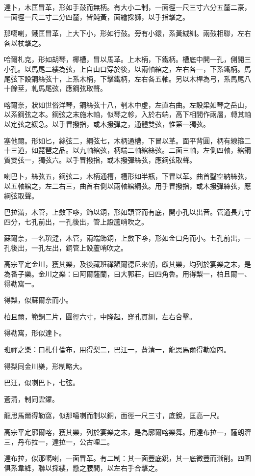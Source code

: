 \begin{pinyinscope}
達卜，木匡冒革，形如手鼓而無柄。有大小二制，一面徑一尺三寸六分五釐二豪，一面徑一尺二寸二分四釐，皆魨黃，面繪採獅，以手指擊之。

那噶喇，鐵匡冒革，上大下小，形如行鼓。旁有小鐶，系黃絨紃。兩鼓相聯，左右各以杖擊之。

哈爾札克，形如胡琴，椰槽，冒以馬革。上木柄，下鐵柄。槽底中開一孔，側開三小孔。以馬尾二縷為弦，上自山口穿於後，以兩軸綰之，左右各一，下系鐵柄。馬尾弦下設鋼絲弦十，上系木柄，下擊鐵柄，左右各五軸。另以木桿為弓，系馬尾八十餘莖，軋馬尾弦，應鋼弦取聲。

喀爾奈，狀如世俗洋琴，鋼絲弦十八，刳木中虛，左直右曲。左設梁如琴之岳山，以系鋼弦之本。鋼弦之末施木軸，似琴之軫，入於右端，高下相間作兩層，轉其軸以定弦之緩急。以手冒撥指，或木撥彈之，通體雙弦，惟第一獨弦。

塞他爾。形如匕，絲弦二，綱弦七，木柄通槽，下冒以革。面平背圓，柄有線箍二十三道，如琵琶之品。以九軸綰弦，柄端二軸綰絲弦。二面三軸，左側四軸，綰鋼質雙弦一，獨弦六。以手冒撥指，或木撥彈絲弦，應鋼弦取聲。

喇巴卜，絲弦五，鋼弦二，木柄通槽，槽形如半瓶，下冒以革。曲首鑿空納絲弦，以五軸綰之，左二右三，曲首右側以兩軸綰綱弦。用手冒撥指，或木撥彈絲弦，應綱弦取聲。

巴拉滿，木管，上斂下哆，飾以銅，形如頭管而有底，開小孔以出音。管通長九寸四分，七孔前出，一孔後出，管上設蘆哨吹之。

蘇爾奈，一名瑣澾，木管，兩端飾銅，上斂下哆，形如金口角而小。七孔前出，一孔後出，一孔左出，銅管上設蘆哨吹之。

高宗平定金川，獲其樂，及後藏班禪額爾德尼來朝，獻其樂，均列於宴樂之末，是為番子樂。金川之樂：曰阿爾薩蘭，曰大郭莊，曰四角魯。用得梨一，柏且爾一、得勒窩一。

得梨，似蘇爾奈而小。

柏且爾，範銅二片，圓徑六寸，中隆起，穿孔貫紃，左右合擊。

得勒窩，形似達卜。

班禪之樂：曰札什倫布，用得梨二，巴汪一，蒼清一，龍思馬爾得勒窩四。

得梨同金川樂，形制略大。

巴汪，似喇巴卜，七弦。

蒼清，制同雲鑼。

龍思馬爾得勒窩，似那噶喇而制以銅，面徑一尺三寸，底銳，匡高一尺。

高宗平定廓爾喀，獲其樂，列於宴樂之末，是為廓爾喀樂舞。用達布拉一，薩朗濟三，丹布拉一，達拉一，公古哩二。

達布拉，似那噶喇，一面冒革。有二制：其一面豐底銳，其一底微豐而漸削。四圍俱系韋絳，聯以採縷，懸之腰間，以左右手合擊之。


\end{pinyinscope}

